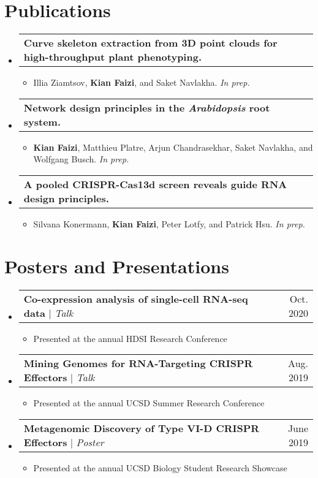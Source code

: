 \documentclass[letterpaper,11pt]{article}
\makeatletter
\newcommand{\resumeItem}[1]{
  \item\small{
    {#1 \vspace{-2pt}}
  }
}
\newcommand{\resumeProjectHeading}[2]{
    \item
    \begin{tabular*}{0.97\textwidth}{l@{\extracolsep{\fill}}r}
      \small#1 & #2 \\
    \end{tabular*}\vspace{-7pt}
}
\newcommand{\resumeSubHeadingListStart}{\begin{itemize}[leftmargin=0.15in, label={}]}
\newcommand{\resumeSubHeadingListEnd}{\end{itemize}}
\newcommand{\resumeItemListStart}{\begin{itemize}}
\newcommand{\resumeItemListEnd}{\end{itemize}\vspace{-5pt}}
\makeatother
\begin{document}
\section{Publications}
    \resumeSubHeadingListStart
      \resumeProjectHeading
          {\textbf{Curve skeleton extraction from 3D point clouds for high-throughput plant phenotyping.}}{}
          \resumeItemListStart
            \resumeItem{Illia Ziamtsov, \textbf{Kian Faizi}, and Saket Navlakha. \emph{In prep.}}
          \resumeItemListEnd
      \resumeProjectHeading
          {\textbf{Network design principles in the \emph{Arabidopsis} root system.}}{}
          \resumeItemListStart
            \resumeItem{\textbf{Kian Faizi}, Matthieu Platre, Arjun Chandrasekhar, Saket Navlakha, and Wolfgang Busch. \emph{In prep.}}
          \resumeItemListEnd
      \resumeProjectHeading
          {\textbf{A pooled CRISPR-Cas13d screen reveals guide RNA design principles.}}{}
          \resumeItemListStart
            \resumeItem{Silvana Konermann, \textbf{Kian Faizi}, Peter Lotfy, and Patrick Hsu. \emph{In prep.}}
          \resumeItemListEnd
    \resumeSubHeadingListEnd

\section{Posters and Presentations}
    \resumeSubHeadingListStart
    \resumeProjectHeading
          {\textbf{Co-expression analysis of single-cell RNA-seq data} $|$ \emph{Talk}}{Oct. 2020}
          \resumeItemListStart
            \resumeItem{Presented at the annual HDSI Research Conference}
          \resumeItemListEnd
      \resumeProjectHeading
          {\textbf{Mining Genomes for RNA-Targeting CRISPR Effectors} $|$ \emph{Talk}}{Aug. 2019}
          \resumeItemListStart
            \resumeItem{Presented at the annual UCSD Summer Research Conference}
          \resumeItemListEnd
      \resumeProjectHeading
          {\textbf{Metagenomic Discovery of Type VI-D CRISPR Effectors} $|$ \emph{Poster}}{June 2019}
          \resumeItemListStart
            \resumeItem{Presented at the annual UCSD Biology Student Research Showcase}
          \resumeItemListEnd
    \resumeSubHeadingListEnd

\end{document}
